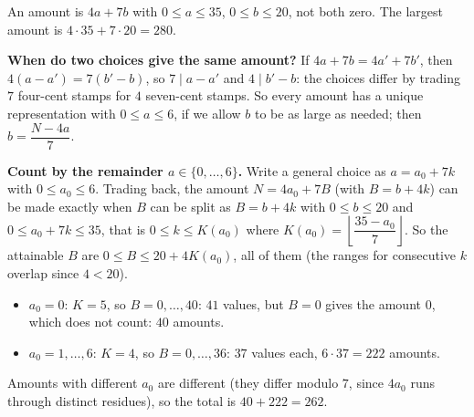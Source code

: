 An amount is $4a+7b$ with $0\le a\le35$, $0\le b\le20$, not both zero. The largest amount is $4\cdot35+7\cdot20=280$.

\textbf{When do two choices give the same amount?} If $4a+7b=4a'+7b'$, then $4(a-a')=7(b'-b)$, so $7\mid a-a'$ and $4\mid b'-b$: the choices differ by trading $7$ four-cent stamps for $4$ seven-cent stamps. So every amount has a unique representation with $0\le a\le6$, if we allow $b$ to be as large as needed; then $b=\dfrac{N-4a}{7}$.

\textbf{Count by the remainder $a\in\{0,\dots,6\}$.} Write a general choice as $a=a_0+7k$ with $0\le a_0\le6$. Trading back, the amount $N=4a_0+7B$ (with $B=b+4k$) can be made exactly when $B$ can be split as $B=b+4k$ with $0\le b\le20$ and $0\le a_0+7k\le35$, that is $0\le k\le K(a_0)$ where $K(a_0)=\left\lfloor\dfrac{35-a_0}{7}\right\rfloor$. So the attainable $B$ are $0\le B\le20+4K(a_0)$, all of them (the ranges for consecutive $k$ overlap since $4<20$).
\begin{itemize}
\item $a_0=0$: $K=5$, so $B=0,\dots,40$: $41$ values, but $B=0$ gives the amount $0$, which does not count: $40$ amounts.
\item $a_0=1,\dots,6$: $K=4$, so $B=0,\dots,36$: $37$ values each, $6\cdot37=222$ amounts.
\end{itemize}
Amounts with different $a_0$ are different (they differ modulo $7$, since $4a_0$ runs through distinct residues), so the total is $40+222=\boxed{262}$.
